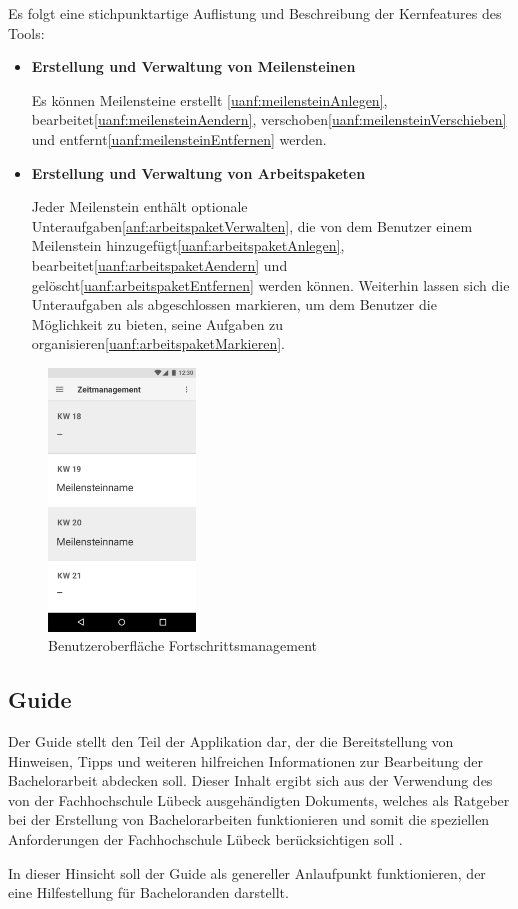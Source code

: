 \documentclass[bibliography=totoc,listof=totoc,BCOR=5mm,DIV=12,oneside]{scrbook}
\begin{document}
\par\bigskip Es folgt eine stichpunktartige Auflistung und Beschreibung der Kernfeatures des Tools:
\begin{itemize}
\item \textbf{Erstellung und Verwaltung von Meilensteinen}
\par Es können Meilensteine erstellt \ref{uanf:meilensteinAnlegen}, bearbeitet\ref{uanf:meilensteinAendern}, verschoben\ref{uanf:meilensteinVerschieben} und entfernt\ref{uanf:meilensteinEntfernen} werden. 
\item \textbf{Erstellung und Verwaltung von Arbeitspaketen}
\par Jeder Meilenstein enthält optionale Unteraufgaben\ref{anf:arbeitspaketVerwalten}, die von dem Benutzer einem Meilenstein hinzugefügt\ref{uanf:arbeitspaketAnlegen}, bearbeitet\ref{uanf:arbeitspaketAendern} und gelöscht\ref{uanf:arbeitspaketEntfernen} werden können. Weiterhin lassen sich die Unteraufgaben als abgeschlossen markieren, um dem Benutzer die Möglichkeit zu bieten, seine Aufgaben zu organisieren\ref{uanf:arbeitspaketMarkieren}.
\end{itemize}

\begin{figure}[H]
	\centering
	\includegraphics[width=0.35\textwidth, keepaspectratio]{Bilder/Prototyp/Zeitmanagement.png}
	\caption{Benutzeroberfläche Fortschrittsmanagement}
	\label{img:fortschrittsmanagement}
\end{figure}

\par \medskip


\newpage
\subsection{Guide}
\par Der Guide stellt den Teil der Applikation dar, der die Bereitstellung von Hinweisen, Tipps und weiteren hilfreichen Informationen zur Bearbeitung der Bachelorarbeit abdecken soll. Dieser Inhalt ergibt sich aus der Verwendung des von der Fachhochschule Lübeck ausgehändigten Dokuments, welches als Ratgeber bei der Erstellung von Bachelorarbeiten funktionieren und somit die speziellen Anforderungen der Fachhochschule Lübeck berücksichtigen soll \citep[vgl. Kapitel 1]{FHLuebeckBAAnleitung}.
\par In dieser Hinsicht soll der Guide als genereller Anlaufpunkt funktionieren, der eine Hilfestellung für Bacheloranden darstellt.
\end{document}
